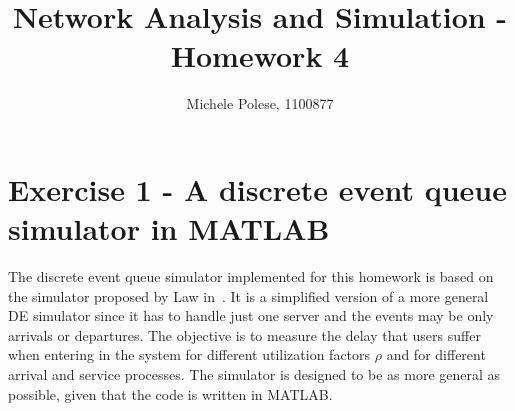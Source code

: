 \documentclass[10pt]{article}
\begin{document}
\title{Network Analysis and Simulation - Homework 4}
\author{Michele Polese, 1100877}

\maketitle

\section*{Exercise 1 - A discrete event queue simulator in MATLAB}
The discrete event queue simulator implemented for this homework is based on the simulator proposed by Law in~\cite{law}. It is a simplified version of a more general DE simulator since it has to handle just one server and the events may be only arrivals or departures. The objective is to measure the delay that users suffer when entering in the system for different utilization factors $\rho$ and for different arrival and service processes. The simulator is designed to be as more general as possible, given that the code is written in MATLAB. 
\end{document}
